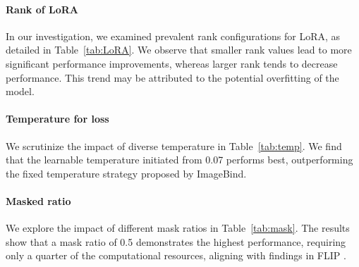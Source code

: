 \documentclass{article} \usepackage{iclr2024_conference,times}
\begin{document}
\paragraph{Rank of LoRA} In our investigation, we examined prevalent rank configurations for LoRA, as detailed in Table~\ref{tab:LoRA}. We observe that smaller rank values lead to more significant performance improvements, whereas larger rank tends to decrease performance. This trend may be attributed to the potential overfitting of the model.

\paragraph{Temperature for loss} We scrutinize the impact of diverse temperature in Table~\ref{tab:temp}. We find that the learnable temperature initiated from 0.07 performs best, outperforming the fixed temperature strategy proposed by ImageBind.

\paragraph{Masked ratio} We explore the impact of different mask ratios in Table~\ref{tab:mask}. The results show that a mask ratio of 0.5 demonstrates the highest performance, requiring only a quarter of the computational resources, aligning with findings in FLIP \citep{li2023scaling}.
\end{document}
